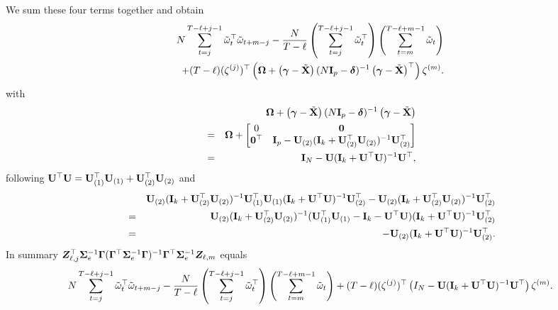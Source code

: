 		
		
		We sum these four terms together and obtain
		\begin{eqnarray*}
				  N \sum_{t=j}^{T - \ell+j-1} \tilde \omega_{t}^\top \tilde \omega_{t+m-j}  - \frac{N}{T - \ell}  \left( \sum_{t=j}^{T - \ell+j-1} \tilde \omega_t^\top  \right)  \left( \sum_{t=m}^{T - \ell+m-1} \tilde \omega_t \right) \\  + (T-\ell)  (\zeta^{(j)})^\top \left( \mathbf{\Omega} + \left( \bm{\gamma} - \tilde{\mathbf{X}} \right)  (N \mathbf{I}_p - \bm{\delta})^{-1} \left( \bm{\gamma} - \tilde{\mathbf{X}} \right)^\top  \right) \zeta^{(m)}.
			\end{eqnarray*}
			with
			\begin{eqnarray*}
				&&  \mathbf{\Omega} + \left( \bm{\gamma} - \tilde{\mathbf{X}} \right)  (N \mathbf{I}_p - \bm{\delta})^{-1} \left( \bm{\gamma} - \tilde{\mathbf{X}} \right) \\
				&=&  \mathbf{\Omega} + \begin{bmatrix}
					0 & \bm{0} \\ \bm{0}^\top & \mathbf{I}_p - \mathbf{U}_{(2)} (\mathbf{I}_k + \mathbf{U}_{(2)}^\top \mathbf{U}_{(2)} )^{-1} \mathbf{U}_{(2)}^\top 
				\end{bmatrix} \\
				&=& \mathbf{I}_N - \mathbf{U} (\mathbf{I}_k + \mathbf{U}^\top \mathbf{U})^{-1} \mathbf{U}^\top,
			\end{eqnarray*}
			following $\mathbf{U}^\top \mathbf{U} = \mathbf{U}_{(1)}^\top \mathbf{U}_{(1)} + \mathbf{U}_{(2)}^\top \mathbf{U}_{(2)}$ and
			\begin{eqnarray*}
				&& \mathbf{U}_{(2)} (\mathbf{I}_k + \mathbf{U}_{(2)}^\top \mathbf{U}_{(2)})^{-1} \mathbf{U}_{(1)}^\top \mathbf{U}_{(1)} (\mathbf{I}_k +  \mathbf{U}^\top \mathbf{U})^{-1} \mathbf{U}_{(2)}^\top  - \mathbf{U}_{(2)} (\mathbf{I}_k + \mathbf{U}_{(2)}^\top \mathbf{U}_{(2)} )^{-1} \mathbf{U}_{(2)}^\top  \\
				&=& \mathbf{U}_{(2)} (\mathbf{I}_k + \mathbf{U}_{(2)}^\top \mathbf{U}_{(2)})^{-1} ( \mathbf{U}_{(1)}^\top \mathbf{U}_{(1)} - \mathbf{I}_k- \mathbf{U}^\top \mathbf{U} )(\mathbf{I}_k +  \mathbf{U}^\top \mathbf{U})^{-1} \mathbf{U}_{(2)}^\top \\
				&=& - \mathbf{U}_{(2)} (\mathbf{I}_k +  \mathbf{U}^\top \mathbf{U})^{-1} \mathbf{U}_{(2)}^\top.
			\end{eqnarray*}
			In summary  $\bm{Z}_{\ell,j}^\top \bm{\Sigma}_e^{-1} \bm{\Gamma} (\bm{\Gamma}^\top \bm{\Sigma}_e^{-1} \bm{\Gamma} )^{-1} \bm{\Gamma}^\top \bm{\Sigma}_e^{-1}  \bm{Z}_{\ell,m}$ equals
			\begin{align*}
			    N \sum_{t=j}^{T - \ell+j-1} \tilde \omega_{t}^\top \tilde \omega_{t+m-j} -  \frac{N}{T - \ell}   \left( \sum_{t=j}^{T - \ell+j-1} \tilde \omega_t^\top  \right)  \left( \sum_{t=m}^{T - \ell+m-1} \tilde \omega_t \right) 
			 + (T - \ell)  (\zeta^{(j)})^\top \left( I_N - \mathbf{U} (\mathbf{I}_k + \mathbf{U}^\top \mathbf{U})^{-1} \mathbf{U}^\top \right) \zeta^{(m)}.
			\end{align*}
		
         
    \Halmos
    \endproof
    
